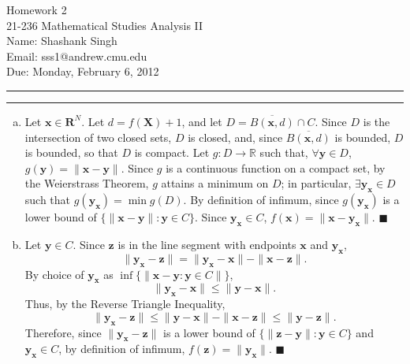 \documentclass[11pt]{article}
\makeatletter
\newcounter{questionCounter}
\newcounter{partCounter}[questionCounter]
\newenvironment{question}[2][\arabic{questionCounter}]{%
    \setcounter{partCounter}{0}%
    \vspace{.25in} \hrule \vspace{0.5em}%
        \noindent{\bf #2}%
    \vspace{0.8em} \hrule \vspace{.10in}%
    \addtocounter{questionCounter}{1}%
}{}
\newcommand{\myname}{Shashank Singh}
\newcommand{\myandrew}{sss1@andrew.cmu.edu}
\newcommand{\myclass}{21-236 Mathematical Studies Analysis II}
\newcommand{\myhwnum}{2}
\newcommand{\duedate}{Monday, February 6, 2012}
\makeatother
\begin{document}
\thispagestyle{plain}

{\Large Homework \myhwnum} \\
\myclass \\
Name: \myname \\
Email: \myandrew \\
Due: \duedate

\begin{question}{Problem 1}
\begin{enumerate}[(a)]
\item Let $\mathbf{x} \in \mathbf{R}^N$. Let $d = f(\mathbf{X}) + 1$, and let
$D = \overline{B(\mathbf{x}, d)} \cap C$. Since $D$ is the intersection of
two closed sets, $D$ is closed, and, since $\overline{B(\mathbf{x}, d)}$ is
bounded, $D$ is bounded, so that $D$ is compact. Let
$g: D \rightarrow \mathbb{R}$ such that, $\forall \mathbf{y} \in D$,
$g(\mathbf{y}) = \|\mathbf{x} - \mathbf{y}\|$. Since $g$ is a continuous
function on a compact set, by the Weierstrass Theorem,
$g$ attains a minimum on $D$; in particular,
$\exists \mathbf{y}_{\mathbf{x}} \in D$ such that
$g(\mathbf{y}_{\mathbf{x}}) = \min g(D)$. By definition of infimum, since
$g(\mathbf{y}_{\mathbf{x}})$ is a lower bound of
$\{\|\mathbf{x} - \mathbf{y}\| : \mathbf{y} \in C\}$. Since
$\mathbf{y}_{\mathbf{x}} \in C$,
$f(\mathbf{x}) = \|\mathbf{x} - \mathbf{y}_{\mathbf{x}}\|$.
\qquad $\blacksquare$

\item Let $\mathbf{y} \in C$. Since $\mathbf{z}$ is in the line segment with endpoints
$\mathbf{x}$ and $\mathbf{y}_{\mathbf{x}}$,
\[\|\mathbf{y}_{\mathbf{x}} - \mathbf{z}\|
 = \|\mathbf{y}_{\mathbf{x}} - \mathbf{x}\| - \|\mathbf{x} - \mathbf{z}\|.\]
By choice of $\mathbf{y}_{\mathbf{x}}$ as
$\inf\{\|\mathbf{x} - \mathbf{y} : \mathbf{y} \in C\|\}$,
\[\|\mathbf{y}_{\mathbf{x}} - \mathbf{x}\| \leq \|\mathbf{y} - \mathbf{x}\|.\]
Thus, by the Reverse Triangle Inequality,
\[\|\mathbf{y}_{\mathbf{x}} - \mathbf{z}\|
 \leq \|\mathbf{y} - \mathbf{x}\| - \|\mathbf{x} - \mathbf{z}\|
 \leq \|\mathbf{y} - \mathbf{z}\|.\] Therefore, since
$\|\mathbf{y}_{\mathbf{x}} - \mathbf{z}\|$ is a lower bound of
$\{\|\mathbf{z} - \mathbf{y}\| : \mathbf{y} \in C\}$ and
$\mathbf{y}_{\mathbf{x}} \in C$, by definition of infimum,
$f(\mathbf{z}) = \|\mathbf{y}_{\mathbf{x}}\|$.
\qquad $\blacksquare$


\end{enumerate}
\end{question}
\end{document}
